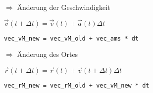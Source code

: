 \documentclass[a4paper, 14pt, fleqn, notitlepage]{scrartcl}
\begin{document}
\begin{minipage}[t]{\paperwidth}
\vspace{0.9cm}

$\Longrightarrow$  \"Anderung der Geschwindigkeit 
  
\vspace{0.4cm}
 
\hspace{2cm}   $\vec{v}(t + \Delta t) = \vec{v}(t) + \vec{a}(t) \Delta t$
 
\vspace{0.4cm}

\hspace{3.0cm} {\tt vec\_vM\_new =   vec\_vM\_old +  vec\_ams * dt}

\vspace{0.9cm}

$ \Longrightarrow$  \"Anderung des Ortes 
   
\vspace{0.4cm}
 
\hspace{2cm}   $\vec{r}(t + \Delta t) = \vec{r}(t) + \vec{v}(t + \Delta t) \Delta t$
 
\vspace{0.4cm}

\hspace{3.0cm} {\tt vec\_rM\_new =   vec\_rM\_old +  vec\_vM\_new * dt}

 \end{minipage}
%

\vspace{2cm}
\end{document}
